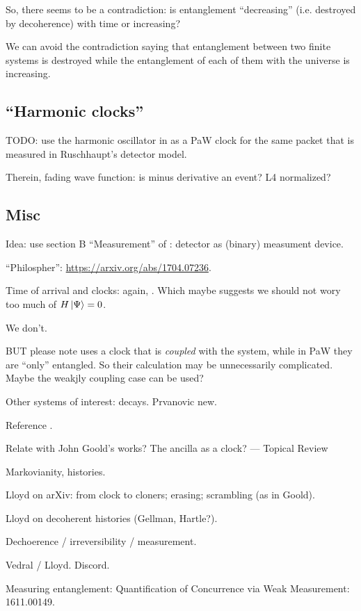 So, there seems to be a contradiction: is entanglement ``decreasing''
(i.e. destroyed by decoherence) with time
or increasing?

We can avoid the contradiction saying that
entanglement between two finite systems is
destroyed while the entanglement of each of them with the universe
is increasing.

\subsection{``Harmonic clocks''}

TODO: use the harmonic oscillator in \cite{HarmonicClocks}
as a PaW clock for the same packet that is measured in
Ruschhaupt's detector model.

Therein, fading wave function: is minus derivative an event?
L4 normalized?


\subsection{Misc}

Idea: use section B ``Measurement'' of \cite{Lloyd:Time}: detector as (binary) measument device.

``Philospher'': \url{https://arxiv.org/abs/1704.07236}.

Time of arrival and clocks: again, \cite{YearsleyHalliwell_Clocks}.
Which maybe suggests we should not wory too much of $H\ket{\Psi} = 0$. 

We don't. 

BUT please note \cite{YearsleyHalliwell_Clocks} uses a clock that is
\emph{coupled} with the system, while in PaW they are ``only'' entangled.
So their calculation may be unnecessarily complicated.
Maybe the weakjly coupling case can be used?

Other systems of interest: decays. Prvanovic new.

Reference \cite{ConnesRovelliThermo}.

Relate with John Goold's works? The ancilla as a clock? --- Topical Review

Markovianity, histories.

Lloyd on arXiv: from clock to cloners; erasing; scrambling (as in Goold).

Lloyd on decoherent histories (Gellman, Hartle?).

Dechoerence / irreversibility / measurement.

Vedral / Lloyd. Discord.

Measuring entanglement: Quantification of Concurrence via Weak Measurement: 1611.00149.

